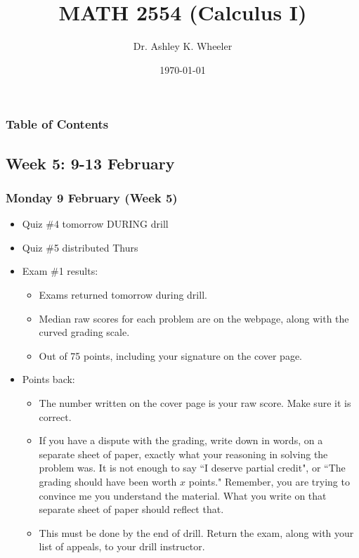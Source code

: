 \documentclass[14pt]{beamer}
\title[Cal I S2015]{MATH 2554 (Calculus I)}
\subtitle{}
\author[Wheeler]{Dr. Ashley K. Wheeler}
\institute{University of Arkansas}
\date{\today}
\begin{document}
\maketitle

\begin{frame}
\frametitle{Table of Contents}
\tableofcontents
\end{frame}

\begin{frame}
\section[Week 5]{Week 5: 9-13 February}
\frametitle{Monday 9 February (Week 5)}
\begin{itemize}
\item Quiz \#4 tomorrow DURING drill
\item Quiz \#5 distributed Thurs
\item Exam \#1 results: 
	\begin{itemize}
	\item Exams returned tomorrow during drill.
	\item Median raw scores for each problem are on the webpage, along with the curved grading scale.
	\item Out of 75 points, including your signature on the cover page.
	\end{itemize}
\end{itemize}
\end{frame}

\begin{frame}
\begin{itemize}
\small
\item Points back: 
	\begin{itemize}
	\footnotesize
	\item The number written on the cover page is your raw score.  Make sure it is correct.
	\item If you have a dispute with the grading, write down in words, on a separate sheet of paper, exactly what your reasoning in solving the problem was.  It is not enough to say ``I deserve partial credit", or ``The grading should have been worth $x$ points."  Remember, you are trying to convince me you understand the material.  What you write on that separate sheet of paper should reflect that.
	\item This must be done by the end of drill.  Return the exam, along with your list of appeals, to your drill instructor.
	\end{itemize}
\end{itemize}
\end{frame}
\end{document}
